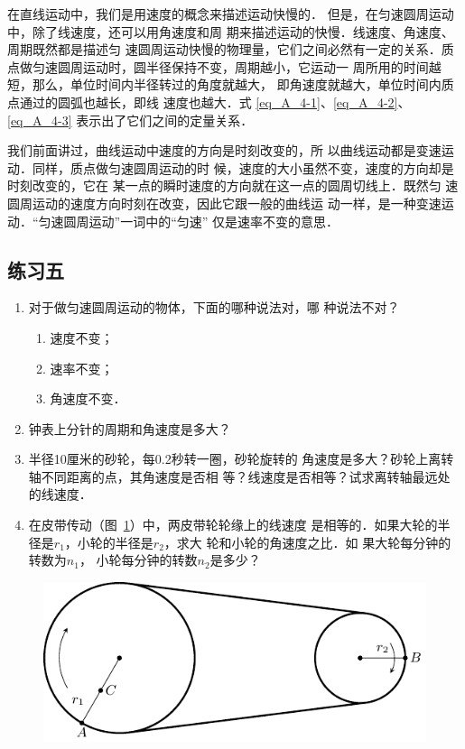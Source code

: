     在直线运动中，我们是用速度的概念来描述运动快慢的．
但是，在匀速圆周运动中，除了线速度，还可以用角速度和周
期来描述运动的快慢．线速度、角速度、周期既然都是描述匀
速圆周运动快慢的物理量，它们之间必然有一定的关系．质
点做匀速圆周运动时，圆半径保持不变，周期越小，它运动一
周所用的时间越短，那么，单位时间内半径转过的角度就越大，
即角速度就越大，单位时间内质点通过的圆弧也越长，即线
速度也越大．式 \eqref{eq_A_4-1}、\eqref{eq_A_4-2}、\eqref{eq_A_4-3} 表示出了它们之间的定量关系．

    我们前面讲过，曲线运动中速度的方向是时刻改变的，所
以曲线运动都是变速运动．同样，质点做匀速圆周运动的时
候，速度的大小虽然不变，速度的方向却是时刻改变的，它在
某一点的瞬时速度的方向就在这一点的圆周切线上．既然匀
速圆周运动的速度方向时刻在改变，因此它跟一般的曲线运
动一样，是一种变速运动．“匀速圆周运动”一词中的“匀速”
仅是速率不变的意思．

\subsection*{练习五}
\begin{enumerate}
\item 对于做匀速圆周运动的物体，下面的哪种说法对，哪
种说法不对？
\begin{enumerate}
\item 速度不变；
\item 速率不变；
\item 角速度不变．
\end{enumerate}
\item 钟表上分针的周期和角速度是多大？
\item 半径10厘米的砂轮，每0.2秒转一圈，砂轮旋转的
角速度是多大？砂轮上离转轴不同距离的点，其角速度是否相
等？线速度是否相等？试求离转轴最远处的线速度．
\item 在皮带传动（图~\ref{fig_A_4-17}）中，两皮带轮轮缘上的线速度
是相等的．如果大轮的半径是$r_1$，小轮的半径是$r_2$，求大
轮和小轮的角速度之比．如
果大轮每分钟的转数为$n_1$，
小轮每分钟的转数$n_2$是多少？
\end{enumerate}

\begin{figure}[htbp]
    \centering
    \includegraphics{fig/A/4-17.pdf}
    \caption{}\label{fig_A_4-17}
\end{figure}

